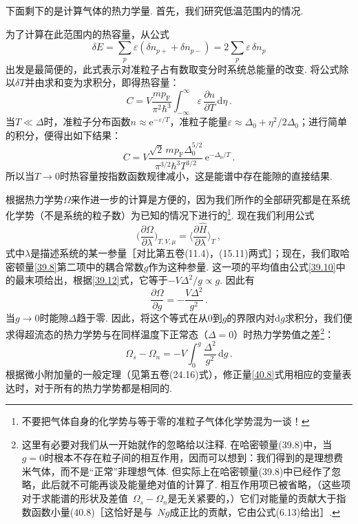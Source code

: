 下面剩下的是计算气体的热力学量. 首先，我们研究低温范围内的情况.

为了计算在此范围内的热容量，从公式
\begin{equation*}
\delta E = \sum_p\varepsilon(\delta n_{p+} + \delta n_{p-}) = 2\sum_p\varepsilon\,\delta n_p
\end{equation*}
出发是最简便的，此式表示对准粒子占有数取变分时系统总能量的改变. 将公式除以$\delta T$并由求和变为求积分，即得热容量：
\begin{equation*}
C = V\frac{mp_{\mathrm F}}{\pi^2\hbar^3}\int_{-\infty}^{\infty}\varepsilon\,\frac{\partial n}{\partial T}\,\mathrm d\eta\,.
\end{equation*}
当$T\ll\Delta$时，准粒子分布函数$n\approx\mathrm e^{-\varepsilon/T}$，准粒子能量$\varepsilon\approx\Delta_0+\eta^2/2\Delta_0$；进行简单的积分，便得出如下结果：
\begin{equation}
C = V\frac{\sqrt2\,mp_{\mathrm F}\Delta_0^{5/2}}{\pi^{3/2}\hbar^3T^{3/2}}\,\mathrm e^{-\Delta_0/T}\,.
\label{40.6}
\end{equation}
所以当$T\to0$时热容量按指数函数规律减小，这是能谱中存在能隙的直接结果.

根据热力学势$\Omega$来作进一步的计算是方便的，因为我们所作的全部研究都是在系统化学势（不是系统的粒子数）为已知的情况下进行的\footnote{不要把气体自身的化学势与等于零的准粒子气体化学势混为一谈！}. 现在我们利用公式
\begin{equation}
\Biggl(\frac{\partial\Omega}{\partial\lambda}\Biggr)_{T,V,\mu}
= \Biggl\langle\frac{\partial\hat H}{\partial\lambda}\Biggr\rangle_T\,,
\label{40.7}
\end{equation}
式中$\lambda$是描述系统的某一参量［对比第五卷(11.4)，(15.11)两式］；现在，我们取哈密顿量\eqref{39.8}第二项中的耦合常数$g$作为这种参量. 这一项的平均值由公式\eqref{39.10}中的最末项给出，根据\eqref{39.12}式，它等于$-V\Delta^2/g\propto g$. 因此有
\begin{equation*}
\frac{\partial\Omega}{\partial g} = -\frac{V\Delta^2}{g^2}\,.
\end{equation*}
当$g\to0$时能隙$\Delta$趋于零. 因此，将这个等式在从0到$g$的界限内对$\mathrm dg$求积分，我们便求得超流态的热力学势与在同样温度下正常态（$\Delta=0$）时热力学势值之差\footnote{这里有必要对我们从一开始就作的忽略给以注释. 在哈密顿量(39.8)中，当~$g=0$时根本不存在粒子间的相互作用，因而可以想到：我们得到的是理想费米气体，而不是“正常”非理想气体. 但实际上在哈密顿量(39.8)中已经作了忽略，此后就不可能再谈及能量绝对值的计算了. 相互作用项已被省略，（这些项对于求能谱的形状及差值~$\Omega_s-\Omega_n$是无关紧要的，）它们对能量的贡献大于指数函数小量(40.8)［这恰好是与~$Ng$成正比的贡献，它由公式(6.13)给出］.}：
\begin{equation}
\Omega_s - \Omega_n = -V\int_0^{g}\frac{\Delta^2}{g^2}\,\mathrm dg\,.
\label{40.8}
\end{equation}
根据微小附加量的一般定理（见第五卷(24.16)式），修正量\eqref{40.8}式用相应的变量表达时，对于所有的热力学势都是相同的.

